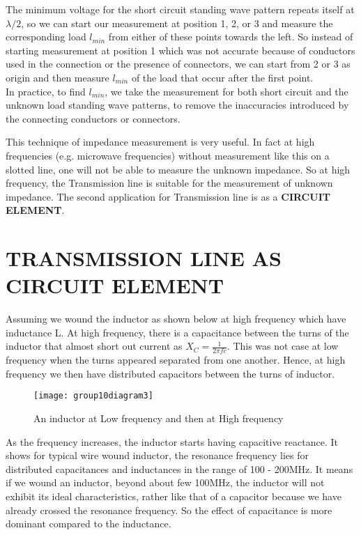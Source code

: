 The minimum voltage for the short circuit standing wave pattern repeats itself at $\lambda/2$, so we can start our measurement at position 1, 2, or 3 and measure the corresponding load $l_{min}$ from either of these points towards the left. So instead of starting measurement at position 1 which was not accurate because of conductors used in the connection or the presence of connectors, we can start from 2 or 3 as origin and  then measure $l_{min}$ of the load that occur after the first point.\\
In practice, to find $l_{min}$, we take the measurement for both short circuit and the unknown load standing
wave patterns, to remove the inaccuracies introduced by the connecting conductors or connectors.\newline

This technique of impedance measurement is very useful. In fact at high frequencies (e.g. microwave frequencies) without measurement like this on a slotted line, one will not be able to measure the unknown impedance. So at high frequency, the Transmission line is suitable for the measurement of unknown impedance.
The second application for Transmission line is as a \textbf{CIRCUIT ELEMENT}.

\section{{\normalsize TRANSMISSION LINE AS CIRCUIT ELEMENT}}

Assuming we wound the inductor as shown below at high frequency which have inductance L. At high frequency, there is a capacitance between the turns of the inductor that almost short out current as $X_{C} = \frac{1}{2\pi fc}$. This was not case at low frequency when the turns appeared separated from one another. Hence, at high frequency we then have distributed capacitors between the turns of inductor.\\
\begin{figure}[h]
	\centering
	\texttt{[image: group10diagram3]}
	\caption{An inductor at Low frequency and then at High frequency}
\end{figure}

As the frequency increases, the inductor starts having capacitive reactance. It shows for typical wire wound inductor, the resonance frequency lies for distributed capacitances and inductances in the range of 100 - 200MHz.
It means if we wound an inductor, beyond about few 100MHz, the inductor will not exhibit its ideal characteristics, rather like that of a capacitor because we have already crossed the resonance frequency. So the effect of capacitance is more dominant compared to the inductance.\\

